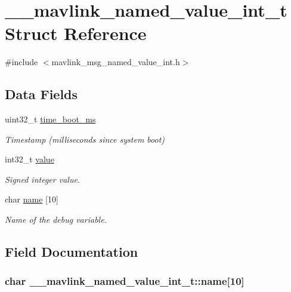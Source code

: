 \hypertarget{struct____mavlink__named__value__int__t}{\section{\+\_\+\+\_\+mavlink\+\_\+named\+\_\+value\+\_\+int\+\_\+t Struct Reference}
\label{struct____mavlink__named__value__int__t}
}


{\ttfamily \#include $<$mavlink\+\_\+msg\+\_\+named\+\_\+value\+\_\+int.\+h$>$}

\subsection*{Data Fields}
\begin{DoxyCompactItemize}
\item 
uint32\+\_\+t \hyperlink{struct____mavlink__named__value__int__t_ab9e1d97f4b6a53bac6086743223c4249}{time\+\_\+boot\+\_\+ms}
\begin{DoxyCompactList}\small\item\em Timestamp (milliseconds since system boot) \end{DoxyCompactList}\item 
int32\+\_\+t \hyperlink{struct____mavlink__named__value__int__t_ab6bdae0f70ba0c8bece0d206c0075fef}{value}
\begin{DoxyCompactList}\small\item\em Signed integer value. \end{DoxyCompactList}\item 
char \hyperlink{struct____mavlink__named__value__int__t_acd99d286e407b448288e54c586229d66}{name} \mbox{[}10\mbox{]}
\begin{DoxyCompactList}\small\item\em Name of the debug variable. \end{DoxyCompactList}\end{DoxyCompactItemize}


\subsection{Field Documentation}
\hypertarget{struct____mavlink__named__value__int__t_acd99d286e407b448288e54c586229d66}{
\subsubsection[{name}]{\setlength{\rightskip}{0pt plus 5cm}char \+\_\+\+\_\+mavlink\+\_\+named\+\_\+value\+\_\+int\+\_\+t\+::name\mbox{[}10\mbox{]}}}\label{struct____mavlink__named__value__int__t_acd99d286e407b448288e54c586229d66}


